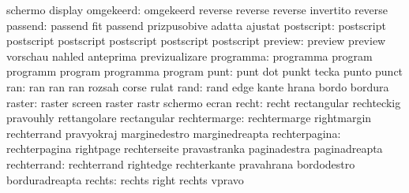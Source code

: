                            schermo                   display %
                omgekeerd: omgekeerd                 reverse
                           reverse                   reverse
                           invertito                 reverse %
                  passend: passend                   fit
                           passend                   prizpusobive
                           adatta                    ajustat
               postscript: postscript                postscript
                           postscript                postscript
                           postscript                postscript
                  preview: preview                   preview
                           vorschau                  nahled
                           anteprima                 previzualizare
                programma: programma                 program
                           programm                  program
                           programma                 program
                     punt: punt                      dot
                           punkt                     tecka
                           punto                     punct
                      ran: ran                       ran
                           ran                       rozsah
                           corse                     rulat
                     rand: rand                      edge
                           kante                     hrana
                           bordo                     bordura
                   raster: raster                    screen
                           raster                    rastr
                           schermo                   ecran
                    recht: recht                     rectangular
                           rechteckig                pravouhly
                           rettangolare              rectangular
             rechtermarge: rechtermarge              rightmargin
                           rechterrand               pravyokraj
                           marginedestro             marginedreapta
            rechterpagina: rechterpagina             rightpage
                           rechterseite              pravastranka
                           paginadestra              paginadreapta
              rechterrand: rechterrand               rightedge
                           rechterkante              pravahrana
                           bordodestro               borduradreapta
                   rechts: rechts                    right
                           rechts                    vpravo
